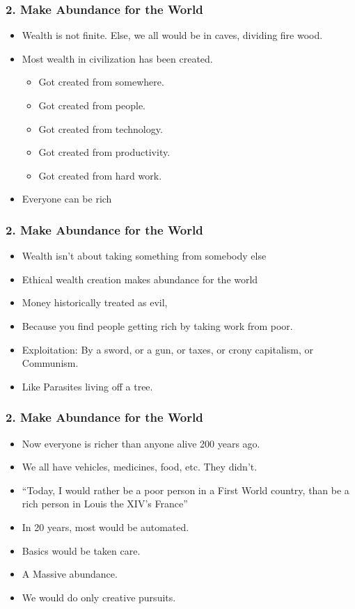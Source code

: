 \begin{frame}[fragile]
\frametitle{2. Make Abundance for the World}
\begin{itemize}
\item Wealth is not finite. Else, we all would be in caves, dividing fire wood.
\item Most wealth in civilization has been created.
\begin{itemize}
\item Got created from somewhere. 
\item Got created from people. 
\item Got created from technology. 
\item Got created from productivity. 
\item Got created from hard work.
\end{itemize}
\item Everyone can be rich
\end{itemize}
\end{frame}

\begin{frame}[fragile]
\frametitle{2. Make Abundance for the World}
\begin{itemize}
\item Wealth isn't about taking something from somebody else
\item Ethical wealth creation makes abundance for the world
\item Money historically treated as evil, 
\item Because you find people getting rich by taking work from poor. 
\item Exploitation: By a sword, or a gun, or taxes, or crony capitalism, or Communism. \item Like Parasites living off a tree.
\end{itemize}
\end{frame}

\begin{frame}[fragile]
\frametitle{2. Make Abundance for the World}
\begin{itemize}
\item Now everyone is richer than anyone alive 200 years ago.
\item We all have vehicles, medicines, food, etc. They didn't.
\item ``Today, I would rather be a poor person in a First World country, than be a rich person in Louis the XIV's France''
\item In 20 years, most would be automated. 
\item Basics would be taken care. 
\item A Massive abundance.
\item We would do only creative pursuits.
\end{itemize}
\end{frame}


